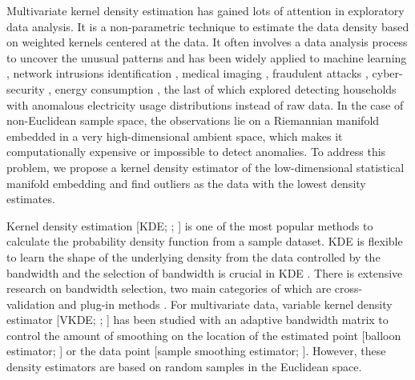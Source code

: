 \documentclass[11pt,a4paper,]{article}
\begin{document}
Multivariate kernel density estimation has gained lots of attention in exploratory data analysis. It is a non-parametric technique to estimate the data density based on weighted kernels centered at the data.
It often involves a data analysis process to uncover the unusual patterns and has been widely applied to machine learning \autocite{Omar2013-lz}, network intrusions identification \autocite{Ahmed2016-co,Bhuyan2013-ra}, medical imaging \autocite{Fernando2022-ef}, fraudulent attacks \autocite{Ahmed2016-dz}, cyber-security \autocite{Ten2011-co}, energy consumption \autocite{Cheng2021-ex}, the last of which explored detecting households with anomalous electricity usage distributions instead of raw data. In the case of non-Euclidean sample space, the observations lie on a Riemannian manifold embedded in a very high-dimensional ambient space, which makes it computationally expensive or impossible to detect anomalies. To address this problem, we propose a kernel density estimator of the low-dimensional statistical manifold embedding and find outliers as the data with the lowest density estimates.

Kernel density estimation {[}KDE; \textcite{Parzen1962-gt}; \textcite{Chen2017-dw}{]} is one of the most popular methods to calculate the probability density function from a sample dataset. KDE is flexible to learn the shape of the underlying density from the data controlled by the bandwidth and the selection of bandwidth is crucial in KDE \autocite{Jones1990-oe,Terrell1992-ut}. There is extensive research on bandwidth selection, two main categories of which are cross-validation \autocite{Jones1992-ta,Sain1994-gr} and plug-in methods \autocite{Wand1994-gc,Duong2003-sp}. For multivariate data, variable kernel density estimator {[}VKDE; \textcite{Jones1990-oe}; \textcite{Terrell1992-ut}{]} has been studied with an adaptive bandwidth matrix to control the amount of smoothing on the location of the estimated point {[}balloon estimator; \textcite{Terrell1992-ut}{]} or the data point {[}sample smoothing estimator; \textcite{Terrell1992-ut}{]}. However, these density estimators are based on random samples in the Euclidean space.
\end{document}

